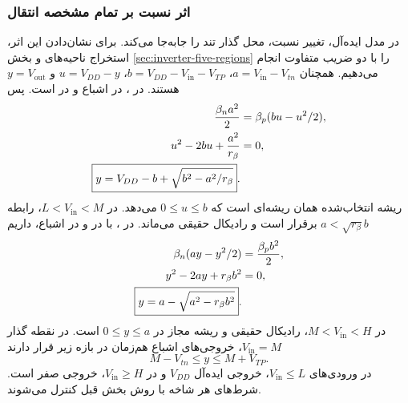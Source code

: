 \subsubsection{اثر نسبت بر تمام مشخصه انتقال}
\label{sec:beta-transfer-curves}
در مدل ایده‌آل، تغییر نسبت، محل گذار تند را جابه‌جا می‌کند.
برای نشان‌دادن این اثر، استخراج ناحیه‌های  و 
بخش \ref{sec:inverter-five-regions} را با دو ضریب متفاوت انجام
می‌دهیم. همچنان \(a=V_{\mathrm{in}}-V_{tn}\)،
\(b=V_{DD}-V_{\mathrm{in}}-V_{TP}\)،
\(u=V_{DD}-y\) و \(y=V_{\mathrm{out}}\) هستند.
در ،  در اشباع و  در  است.
پس
\begin{align}
 \frac{\beta_n a^2}{2}&=\beta_p(bu-u^2/2),\notag\\
 u^2-2bu+\frac{a^2}{r_\beta}&=0,\notag\\
 \boxed{y=V_{DD}-b+\sqrt{b^2-a^2/r_\beta}}.
 \label{eq:beta-b-transfer}
\end{align}
ریشه انتخاب‌شده همان ریشه‌ای است که \(0\le u\le b\) می‌دهد.
در \(L<V_{\mathrm{in}}<M\)، رابطه
\(a<\sqrt{r_\beta}b\) برقرار است و رادیکال حقیقی می‌ماند.
در ، با  در  و  در
اشباع، داریم
\begin{align}
 \beta_n(ay-y^2/2)&=\frac{\beta_pb^2}{2},\notag\\
 y^2-2ay+r_\beta b^2&=0,\notag\\
 \boxed{y=a-\sqrt{a^2-r_\beta b^2}}.
 \label{eq:beta-d-transfer}
\end{align}
در \(M<V_{\mathrm{in}}<H\)، رادیکال حقیقی و ریشه مجاز در
\(0\le y\le a\) است. در نقطه گذار \(V_{\mathrm{in}}=M\)،
خروجی‌های اشباع هم‌زمان در بازه زیر قرار دارند
\begin{equation}
 M-V_{tn}\le y\le M+V_{TP}.
 \label{eq:beta-c-interval}
\end{equation}
در ورودی‌های \(V_{\mathrm{in}}\le L\)، خروجی ایده‌آل
\(V_{DD}\) و در \(V_{\mathrm{in}}\ge H\)، خروجی صفر است.
شرط‌های هر شاخه با روش بخش قبل کنترل می‌شوند.

